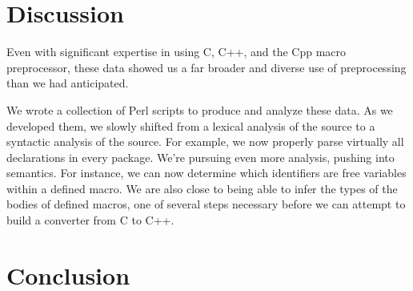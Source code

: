 
\section{Discussion}\label{sec:discussion}

Even with significant expertise in using C, C++, and the Cpp macro
preprocessor, these data showed us a far broader and diverse use of
preprocessing than we had anticipated.  

We wrote a collection of Perl scripts to produce and analyze these
data.  As we developed them, we slowly shifted from a lexical analysis
of the source to a syntactic analysis of the source.  For example, we
now properly parse virtually all declarations in every package.  We're
pursuing even more analysis, pushing into semantics.  For instance, we
can now determine which identifiers are free variables within a defined
macro.  We are also close to being able to infer the types of the bodies
of defined macros, one of several steps necessary before we can attempt
to build a converter from C to C++.

\section{Conclusion}\label{sec:conclusion}

\small 




